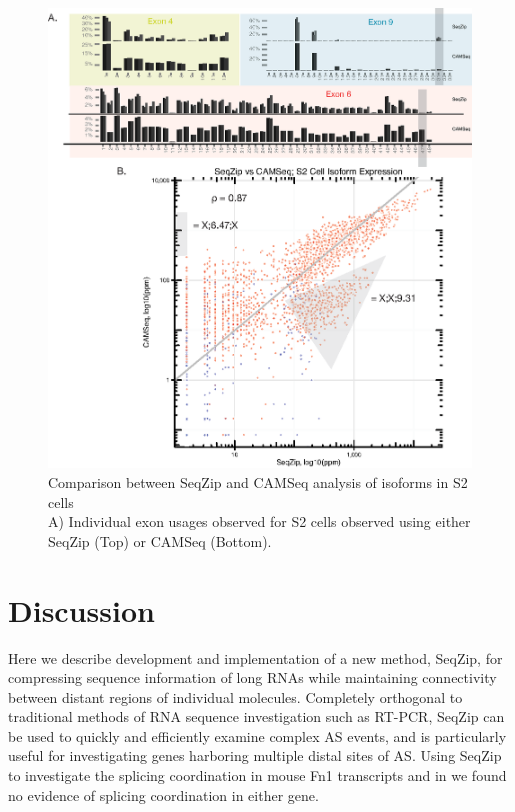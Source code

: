 		\begin{figure} %
			  \centering 
			  \includegraphics{Figures/SeqZipPaper/Roy2014FigS5.eps}
			  \caption[Comparison between SeqZip and CAMSeq analysis of \dscam{} isoforms in S2 cells]
			  {Comparison between SeqZip and CAMSeq analysis of \dscam{} isoforms in S2 cells \\[0.25cm]
			    A) Individual exon usages observed for S2 cells observed using either SeqZip (Top) or CAMSeq (Bottom). 
			    }
			  \label{SeqZipPaper:fig:Roy2014 FS5}
			  \end{figure}

\section{Discussion}\label{SeqZipPaper:sec:Discussion}

	Here we describe development and implementation of a new method, SeqZip, for compressing sequence information of long RNAs while maintaining connectivity between distant regions of individual molecules. Completely orthogonal to traditional methods of RNA sequence investigation such as RT-PCR, SeqZip can be used to quickly and efficiently examine complex AS events, and is particularly useful for investigating genes harboring multiple distal sites of AS. Using SeqZip to investigate the splicing coordination in mouse Fn1 transcripts and in \flies{} \dscam{} we found no evidence of splicing coordination in either gene. 

